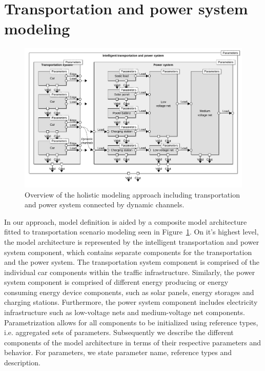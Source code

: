 \section{Transportation and power system modeling}
\label{section:contribution_1}

\begin{figure}[b]
	\centering
	\includegraphics[width=\textwidth]{../gfx/model.pdf}
	\caption{Overview of the holistic modeling approach including transportation and power system connected by dynamic channels.}
	\label{fig:model}
\end{figure}

In our approach, model definition is aided by a composite model architecture fitted to transportation scenario modeling seen in Figure~\ref{fig:model}. On it's highest level, the model architecture is represented by the intelligent transportation and power system component, which contains separate components for the transportation and the power system. The transportation system component is comprised of the individual car components within the traffic infrastructure. Similarly, the power system component is comprised of different energy producing or energy consuming energy device components, such as solar panels, energy storages and charging stations. Furthermore, the power system component includes electricity infrastructure such as low-voltage nets and medium-voltage net components. Parametrization allows for all components to be initialized using reference types, i.e. aggregated sets of parameters. Subsequently we describe the different components of the model architecture in terms of their respective parameters and behavior. For parameters, we state parameter name, reference types and description.

